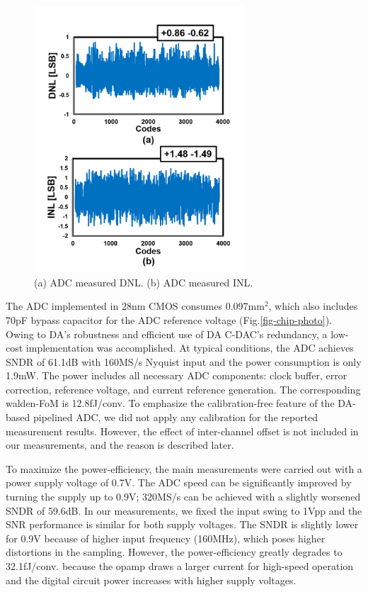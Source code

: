 \begin{figure}[!]
\centering
  \includegraphics[width=0.7\textwidth]{figure/chap2/dnl-inl.png}
  \caption{(a) ADC measured DNL. (b) ADC measured INL.  }
  \label{fig-DNL}
\end{figure}


The ADC implemented in 28nm CMOS consumes 0.097mm$^\text{2}$, which also includes 70pF bypass capacitor for the ADC reference voltage (Fig.\ref{fig-chip-photo}). Owing to DA’s robustness and efficient use of DA C-DAC's redundancy, a low-cost implementation was accomplished. At typical conditions, the ADC achieves SNDR of 61.1dB with 160MS/s Nyquist input and the power consumption is only 1.9mW. The power includes all necessary ADC components: clock buffer, error correction, reference voltage, and current reference generation. The corresponding walden-FoM is 12.8fJ/conv. To emphasize the calibration-free feature of the DA-based pipelined ADC, we did not apply any calibration for the reported measurement results. However, the effect of inter-channel offset is not included in our measurements, and the reason is described later.


To maximize the power-efficiency, the main measurements were carried out with a power supply voltage of 0.7V. The ADC speed can be significantly improved by turning the supply up to 0.9V; 320MS/s can be achieved with a slightly worsened SNDR of 59.6dB. In our measurements, we fixed the input swing to 1Vpp and the SNR performance is similar for both supply voltages. The SNDR is slightly lower for 0.9V because of higher input frequency (160MHz), which poses higher distortions in the sampling. However, the power-efficiency greatly degrades to 32.1fJ/conv. because the opamp draws a larger current for high-speed operation and the digital circuit power increases with higher supply voltages.

